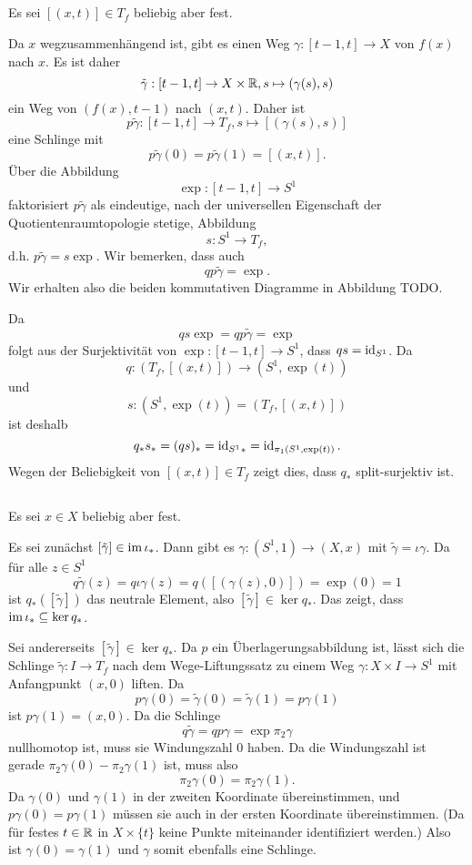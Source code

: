 \documentclass[a4paper,10pt]{article}
\begin{document}
\subsection{}
Es sei $[(x,t)] \in T_f$ beliebig aber fest.

Da $x$ wegzusammenhängend ist, gibt es einen Weg $\gamma : [t-1,t] \to X$ von $f(x)$ nach $x$. Es ist daher
\[
 \tilde{\gamma} : [t-1,t] \to X \times \mathbb{R}, s \mapsto (\gamma(s),s)
\]
ein Weg von $(f(x),t-1)$ nach $(x,t)$. Daher ist
\[
 p \tilde{\gamma} : [t-1,t] \to T_f, s \mapsto [(\gamma(s),s)]
\]
eine Schlinge mit
\[
 p\tilde{\gamma}(0) = p\tilde{\gamma}(1) = [(x,t)].
\]
Über die Abbildung
\[
 \exp : [t-1,t] \to S^1
\]
faktorisiert $p\tilde{\gamma}$ als eindeutige, nach der universellen Eigenschaft der Quotientenraumtopologie stetige, Abbildung
\[
 s : S^1 \to T_f,
\]
d.h. $p \tilde{\gamma} = s \exp$. Wir bemerken, dass auch
\[
 q p \tilde{\gamma} = \exp.
\]
Wir erhalten also die beiden kommutativen Diagramme in Abbildung TODO.

Da
\[
 q s \exp = q p \tilde{\gamma} = \exp
\]
folgt aus der Surjektivität von $\exp : [t-1,t] \to S^1$, dass $qs = \operatorname{id}_{S^1}$. Da
\[
 q : (T_f, [(x,t)]) \to (S^1, \exp(t))
\]
und
\[
 s : (S^1, \exp(t)) = (T_f, [(x,t)])
\]
ist deshalb
\[
 q_* s_* = (qs)_* = {\operatorname{id}_{S^1}}_* = \operatorname{id}_{\pi_1(S^1,\exp(t))}.
\]
Wegen der Beliebigkeit von $[(x,t)] \in T_f$ zeigt dies, dass $q_*$ split-surjektiv ist.


\subsection{}
Es sei $x \in X$ beliebig aber fest.

Es sei zunächst $[\tilde{\gamma}] \in \operatorname{im} \iota_*$. Dann gibt es $\gamma : (S^1, 1) \to (X,x)$ mit $\tilde{\gamma} = \iota \gamma$. Da für alle $z \in S^1$
\[
 q \tilde{\gamma}(z)
 = q \iota \gamma(z)
 = q ([(\gamma(z),0)])
 = \exp(0)
 = 1
\]
ist $q_*([\tilde{\gamma}])$ das neutrale Element, also $[\tilde{\gamma}] \in \ker q_*$. Das zeigt, dass $\operatorname{im} \iota_* \subseteq \ker q_*$.

Sei andererseits $[\tilde{\gamma}] \in \ker q_*$. Da $p$ ein Überlagerungsabbildung ist, lässt sich die Schlinge $\tilde{\gamma} : I \to T_f$ nach dem Wege-Liftungssatz zu einem Weg $\gamma : X \times I \to S^1$ mit Anfangpunkt $(x,0)$ liften. Da
\[
 p \gamma(0) = \tilde{\gamma}(0) = \tilde{\gamma}(1) = p \gamma (1)
\]
ist $p \gamma(1) = (x,0)$. Da die Schlinge
\[
 q \tilde{\gamma}
 = q p \gamma
 = \exp \pi_2 \gamma
\]
nullhomotop ist, muss sie Windungszahl $0$ haben. Da die Windungszahl ist gerade $\pi_2 \gamma(0) - \pi_2 \gamma(1)$ ist, muss also
\[
 \pi_2 \gamma(0) = \pi_2 \gamma(1).
\]
Da $\gamma(0)$ und $\gamma(1)$ in der zweiten Koordinate übereinstimmen, und $p \gamma(0) = p \gamma(1)$ müssen sie auch in der ersten Koordinate übereinstimmen. (Da für festes $t \in \mathbb{R}$ in $X \times \{t\}$ keine Punkte miteinander identifiziert werden.) Also ist $\gamma(0) = \gamma(1)$ und $\gamma$ somit ebenfalls eine Schlinge.
\end{document}
